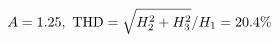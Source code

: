 \documentclass[preview]{standalone}
\begin{document}
\begin{align*}
\special{dvisvgm:raw <g id='unique000'>}A=1.25,\ \text{THD}=\sqrt{H_2^2+H_3^2}/H_1=20.4\%\special{dvisvgm:raw </g>}
\end{align*}
\end{document}
